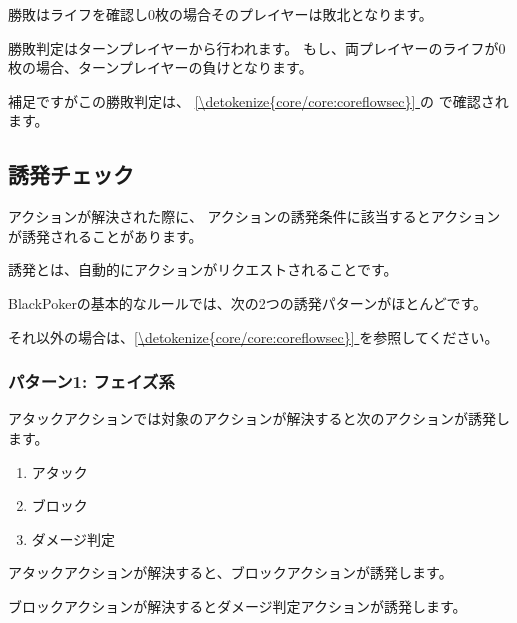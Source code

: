 \documentclass[letterpaper,10pt,dvipdfmx]{sphinxmanual}
\begin{document}
\sphinxAtStartPar
勝敗はライフを確認し0枚の場合そのプレイヤーは敗北となります。

\sphinxAtStartPar
勝敗判定はターンプレイヤーから行われます。
もし、両プレイヤーのライフが0枚の場合、ターンプレイヤーの負けとなります。

\sphinxAtStartPar
補足ですがこの勝敗判定は、 \hyperref[\detokenize{core/core:coreflowsec}]{\ref{\detokenize{core/core:coreflowsec}} } の {\hyperref[\detokenize{core/core:winlose}]{}} で確認されます。


\subsection{誘発チェック}
\label{\detokenize{common/common:id32}}
\sphinxAtStartPar
アクションが解決された際に、
アクションの誘発条件に該当するとアクションが誘発されることがあります。

\sphinxAtStartPar
誘発とは、自動的にアクションがリクエストされることです。

\sphinxAtStartPar
BlackPokerの基本的なルールでは、次の2つの誘発パターンがほとんどです。

\sphinxAtStartPar
それ以外の場合は、\hyperref[\detokenize{core/core:coreflowsec}]{\ref{\detokenize{core/core:coreflowsec}} } を参照してください。


\subsubsection{パターン1: フェイズ系}
\label{\detokenize{common/common:id33}}
\sphinxAtStartPar
アタックアクションでは対象のアクションが解決すると次のアクションが誘発します。
\begin{enumerate}
%
\item {} 
\sphinxAtStartPar
アタック

\item {} 
\sphinxAtStartPar
ブロック

\item {} 
\sphinxAtStartPar
ダメージ判定

\end{enumerate}

\sphinxAtStartPar
アタックアクションが解決すると、ブロックアクションが誘発します。

\sphinxAtStartPar
ブロックアクションが解決するとダメージ判定アクションが誘発します。
\end{document}
